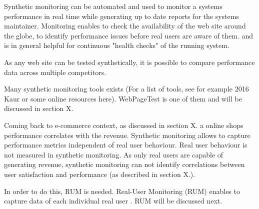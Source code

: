 Synthetic monitoring can be automated and used to monitor a systems performance in real time while generating up to date reports for the systems maintainer. %
Monitoring enables to check the availability of the web site around the globe, %
to identify performance issues before real users are aware of them. %
and is in general helpful for continuous "health checks" of the running system. %

As any web site can be tested synthetically, it is possible to compare performance data across multiple competitors. %



Many synthetic monitoring tools exists (For a list of tools, see for example 2016 Kaur or some online resources here).
WebPageTest is one of them and will be discussed in section X.



Coming back to e-commerce context, as discussed in section X.  a online shops performance correlates with the revenue.
Synthetic monitoring allows to capture performance metrics independent of real user behaviour.
Real user behaviour is not measured in synthetic monitoring.
As only real users are capable of generating revenue, synthetic monitoring can not identify correlations between user satisfaction and performance (as described in section X.).%

In order to do this, RUM is needed.
Real-User Monitoring (RUM) enables to capture data of each individual real user .
RUM will be discussed next.









